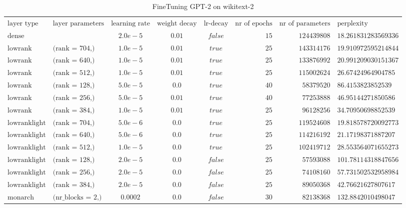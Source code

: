 \begin{sidewaystable}[h!]
\centering
\tiny
\caption{FineTuning GPT-2 on wikitext-2}
\label{tab:ft_results}
\begin{tabular}{llcccrrl}
$\text{layer type}$ & $\text{layer parameters}$ & $\text{learning rate}$ & $\text{weight decay}$ & $\text{lr-decay}$ & $\text{nr of epochs}$ & $\text{nr of parameters}$ & $\text{perplexity}$\\
$\text{dense}$ & $\text{}$ & $2.0e-5$ & $0.01$ & $false$ & $15$ & $124439808$ & $18.261831283569336$\\
$\text{lowrank}$ & $\text{(rank = 704,)}$ & $1.0e-5$ & $0.01$ & $true$ & $25$ & $143314176$ & $19.910972595214844$\\
$\text{lowrank}$ & $\text{(rank = 640,)}$ & $1.0e-5$ & $0.01$ & $true$ & $25$ & $133876992$ & $20.991209030151367$\\
$\text{lowrank}$ & $\text{(rank = 512,)}$ & $1.0e-5$ & $0.01$ & $true$ & $25$ & $115002624$ & $26.67424964904785$\\
$\text{lowrank}$ & $\text{(rank = 128,)}$ & $5.0e-5$ & $0.0$ & $true$ & $40$ & $58379520$ & $86.4153823852539$\\
$\text{lowrank}$ & $\text{(rank = 256,)}$ & $5.0e-5$ & $0.01$ & $true$ & $40$ & $77253888$ & $46.95144271850586$\\
$\text{lowrank}$ & $\text{(rank = 384,)}$ & $1.0e-5$ & $0.01$ & $true$ & $25$ & $96128256$ & $34.70950698852539$\\
$\text{lowranklight}$ & $\text{(rank = 704,)}$ & $5.0e-6$ & $0.0$ & $true$ & $25$ & $119524608$ & $19.818578720092773$\\
$\text{lowranklight}$ & $\text{(rank = 640,)}$ & $5.0e-6$ & $0.0$ & $true$ & $25$ & $114216192$ & $21.17198371887207$\\
$\text{lowranklight}$ & $\text{(rank = 512,)}$ & $1.0e-5$ & $0.0$ & $true$ & $25$ & $102419712$ & $28.553564071655273$\\
$\text{lowranklight}$ & $\text{(rank = 128,)}$ & $2.0e-5$ & $0.0$ & $false$ & $25$ & $57593088$ & $101.78114318847656$\\
$\text{lowranklight}$ & $\text{(rank = 256,)}$ & $2.0e-5$ & $0.0$ & $false$ & $25$ & $74108160$ & $57.731502532958984$\\
$\text{lowranklight}$ & $\text{(rank = 384,)}$ & $2.0e-5$ & $0.0$ & $false$ & $25$ & $89050368$ & $42.76621627807617$\\
$\text{monarch}$ & $\text{(nr\_blocks = 2,)}$ & $0.0002$ & $0.0$ & $false$ & $30$ & $82138368$ & $132.8842010498047$\\

\end{tabular}
\end{sidewaystable}

